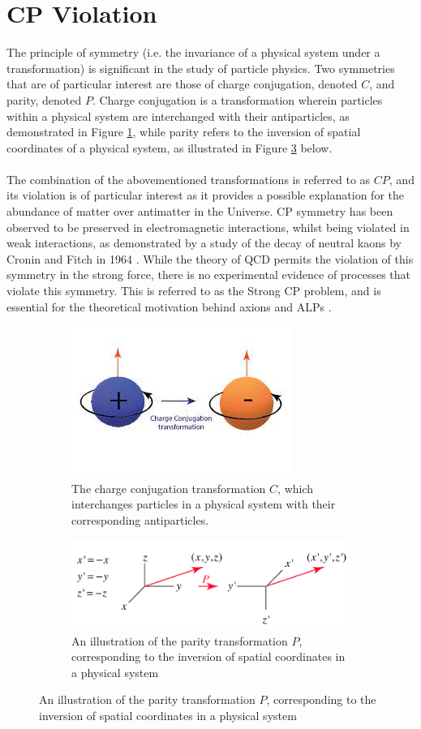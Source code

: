 \section{CP Violation}
The principle of symmetry (i.e. the invariance of a physical system under a transformation) is significant in the study of particle physics. Two symmetries that are of particular interest are those of charge conjugation, denoted $C$, and parity, denoted $P$. Charge conjugation is a transformation wherein particles within a physical system are interchanged with
their antiparticles, as demonstrated in Figure \ref{ChargeConjugation}, while parity refers to the inversion of spatial coordinates of a physical system, as illustrated in Figure \ref{ParityTransformation} below. 
\\
\\
The combination of the abovementioned transformations is referred to as $CP$, and its violation is of particular interest as it provides a possible explanation for the abundance of matter over antimatter in the Universe. CP symmetry has been observed to be preserved in electromagnetic interactions, whilst being violated in weak interactions, as demonstrated by 
a study of the decay of neutral kaons by Cronin and Fitch in 1964 \cite{PhysRevLett.13.138}. While the theory of QCD permits the violation of this symmetry in the strong force, there is no experimental evidence of processes that violate this symmetry. This is referred to as the Strong CP problem, and is essential for the theoretical motivation behind axions and ALPs \cite{PhysRevLett.40.223}.
\begin{figure}[H]
    \centering
    \begin{subfigure}{0.5\textwidth}
        \includegraphics[]{ChargeConjugation.jpg}
        \caption{The charge conjugation transformation $C$, which interchanges particles in a physical system with their corresponding antiparticles.}
        \label{ChargeConjugation}
    \end{subfigure}
    \hfill
    \begin{subfigure}{0.7\textwidth}
        \includegraphics[]{ParityTransformation.png}
        \caption{An illustration of the parity transformation $P$, corresponding
        to the inversion of spatial coordinates in a physical system}
        \label{ParityTransformation}
    \end{subfigure}
    \hfill
\end{figure}

